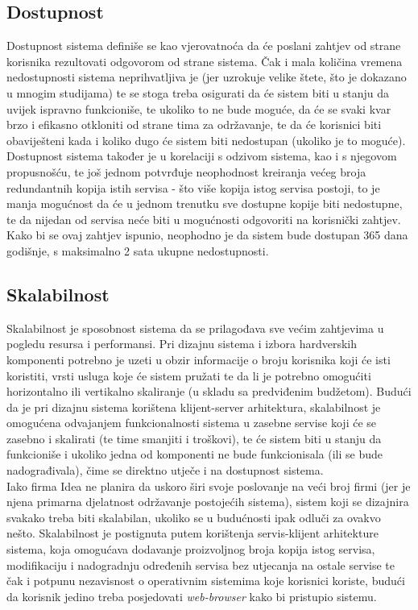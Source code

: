 \documentclass[12pt,a4paper]{article}
\begin{document}
\subsection{Dostupnost}

\quad Dostupnost sistema definiše se kao vjerovatnoća da će poslani zahtjev od strane korisnika rezultovati odgovorom od strane sistema. Čak i mala količina vremena nedostupnosti sistema neprihvatljiva je (jer uzrokuje velike štete, što je dokazano u mnogim studijama) te se stoga treba osigurati da će sistem biti u stanju da uvijek ispravno funkcioniše, te ukoliko to ne bude moguće, da će se svaki kvar brzo i efikasno otkloniti od strane tima za održavanje, te da će korisnici biti obaviješteni kada i koliko dugo će sistem biti nedostupan (ukoliko je to moguće). \\

Dostupnost sistema također je u korelaciji s odzivom sistema, kao i s njegovom propusnošću, te još jednom potvrđuje neophodnost kreiranja većeg broja redundantnih kopija istih servisa - što više kopija istog servisa postoji, to je manja mogućnost da će u jednom trenutku sve dostupne kopije biti nedostupne, te da nijedan od servisa neće biti u mogućnosti odgovoriti na korisnički zahtjev. Kako bi se ovaj zahtjev ispunio, neophodno je da sistem bude dostupan 365 dana godišnje, s maksimalno 2 sata ukupne nedostupnosti.

\subsection{Skalabilnost}

\quad Skalabilnost je sposobnost sistema da se prilagođava sve većim zahtjevima u pogledu resursa i performansi. Pri dizajnu sistema i izbora hardverskih komponenti potrebno je uzeti u obzir informacije o broju korisnika koji će isti koristiti, vrsti usluga koje će sistem pružati te da li je potrebno omogućiti horizontalno ili vertikalno skaliranje (u skladu sa predviđenim budžetom). Budući da je pri dizajnu sistema korištena klijent-server arhitektura, skalabilnost je omogućena odvajanjem funkcionalnosti sistema u zasebne servise koji će se zasebno i skalirati (te time smanjiti i troškovi), te će sistem biti u stanju da funkcioniše i ukoliko jedna od komponenti ne bude funkcionisala (ili se bude nadograđivala), čime se direktno utječe i na dostupnost sistema. \\

Iako firma Idea ne planira da uskoro širi svoje poslovanje na veći broj firmi (jer je njena primarna djelatnost održavanje postojećih sistema), sistem koji se dizajnira svakako treba biti skalabilan, ukoliko se u budućnosti ipak odluči za ovakvo nešto. Skalabilnost je postignuta putem korištenja servis-klijent arhitekture sistema, koja omogućava dodavanje proizvoljnog broja kopija istog servisa, modifikaciju i nadogradnju određenih servisa bez utjecanja na ostale servise te čak i potpunu nezavisnost o operativnim sistemima koje korisnici koriste, budući da korisnik jedino treba posjedovati \textit{web-browser} kako bi pristupio sistemu.
\end{document}
